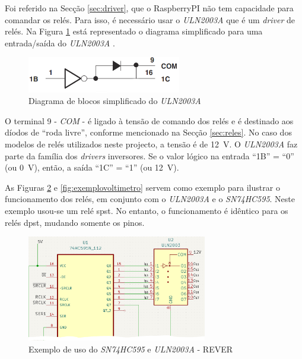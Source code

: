 Foi referido na Secção \ref{sec:driver}, que o \gls{RaspberryPI} não tem capacidade para comandar os relés. Para isso, é necessário usar o \textit{ULN2003A} que é um \textit{driver} de relés. Na Figura \ref{fig:diagramablocos2003} está representado o diagrama simplificado para uma entrada/saída do \textit{ULN2003A} \cite{ULN2003}.

\begin{figure}[hbtp]
	\centering
	\includegraphics[width=0.6\textwidth]{figures/uln2003_diagramablocos.png}
	\caption{Diagrama de blocos simplificado do \textit{ULN2003A}}
	\label{fig:diagramablocos2003}
\end{figure}

O terminal 9 - \textit{COM} - é ligado à tensão de comando dos relés e é destinado aos díodos de ``roda livre'', conforme mencionado na Secção \ref{sec:reles}. No caso dos modelos de relés utilizados neste projecto, a tensão é de \SI{12}{\volt}.
O \textit{ULN2003A} faz parte da família dos \textit{drivers} inversores. Se o valor lógico na entrada ``1B'' = ``0'' (ou \SI{0}{\volt}), então, a saída ``1C'' = ``1'' (ou \SI{12}{\volt}).

As Figuras \ref{fig:comandorelesfull} e \ref{fig:exemplovoltimetro} servem como exemplo para ilustrar o funcionamento dos relés, em conjunto com o \textit{ULN2003A} e o \textit{SN74HC595}. Neste exemplo usou-se um relé \acrshort{spst}. No entanto, o funcionamento é idêntico para os relés \acrshort{dpst}, mudando somente os pinos.

\begin{figure}[hbtp]
	\centering
	\includegraphics[width=0.7\textwidth]{figures/comandoreles_FULL.png}
	\caption{Exemplo de uso do \textit{SN74HC595} e \textit{ULN2003A} - REVER}
	\label{fig:comandorelesfull}
\end{figure}

